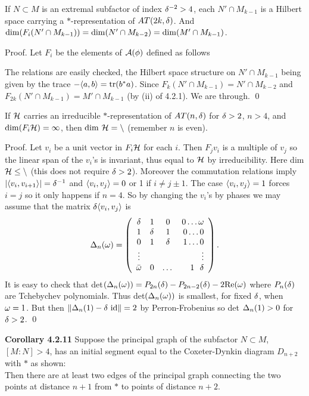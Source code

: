 \bigskip
{} If $N\subset M$ is an extremal subfactor
of index $\delta^{-2} >4$, each $N'\cap M_{k-1}$ is a Hilbert space
carrying a $*$-representation of $AT(2k,\delta)$. And
${\bf\rm{dim}}(F_i(N'\cap M_{k-1}))={\bf\rm{dim}}(N'\cap M_{k-2})=
{\bf\rm{dim}}(M'\cap M_{k-1})$.

\bigskip
{\sc Proof.} Let $F_i$ be the elements of $\cal A(\phi)$ defined
as follows

\newpage

\ni The relations are easily checked, the Hilbert space structure
on $N'\cap M_{k-1}$ being given by the trace
$-\langle a,b\rangle={\bf\rm{tr}}(b^*a)$. Since
$F_k(N'\cap M_{k-1})=N'\cap M_{k-2}$ and $F_{2k}
(N'\cap M_{k-1})=M'\cap M_{k-1}$ (by (ii) of 4.2.1).
We are through. \qed

\bigskip
{} If $\cal H$ carries an irreducible
 $*$-representation of $AT(n,\delta)$ for $\delta >2$, $n>4$, and
${\bf\rm{dim}}(F_i\cal H)=1$, then ${\bf\rm{dim}} \ \cal H=n$
(remember $n$ is even).

\bigskip
{\sc Proof.} Let $v_i$ be a unit vector in $F_i\cal H$ for each
$i$. Then $F_jv_i$ is a multiple of $v_j$ so the linear span of the
$v_i$'s is invariant, thus equal to $\cal H$ by irreducibility.
Here dim $\cal H\leq n$ (this does not require $\delta >2$). Moreover
the commutation relations imply $|\langle v_i,v_{i+1}\rangle|=\delta^{-1}$ and
$\langle v_i,v_j\rangle=0$ or 1 if $i\neq j\pm 1$. The case
$\langle v_i,v_j\rangle=1$ forces $i=j$ so it only happens if $n=4$.
So by changing the $v_i$'s by phases we may assume that the matrix
$\delta\langle v_i,v_j\rangle$ is
\[
\Delta_n(\omega) =\left(
\begin{array}{clcr}
\delta & 1 & 0 & 0  \dots  \omega \\
 1 & \delta & 1 & 0  \dots  0 \\
 0 & 1 & \delta & 1  \dots  0 \\
\vdots & {} & {} & {}    \vdots \\
\bar{\omega} & 0 & \dots & {}   {1 \ \ \delta}
\end{array}\right).
\]
It is easy to check that det$(\Delta_n(\omega))=P_{2n}(\delta)-P_{2n-2}(\delta)-2
{\bf\rm{Re}}(\omega)$ where $P_n(\delta)$ are Tchebychev polynomials.
Thus det$(\Delta_n(\omega))$ is smallest, for fixed $\delta$, when $\omega=1$.
But then \newline $\|\Delta_n(1)-\delta \ {\bf\rm{id}}\|=2$ by Perron-Frobenius
so det $\Delta_n(1) >0$ for $\delta >2$. \qed

\bs\ni
{\bf Corollary 4.2.11} Suppose the principal graph of the
subfactor $N\subset M$, $[M:N]>4$, has an initial segment equal to
the Coxeter-Dynkin diagram $D_{n+2}$ with $*$ as shown:
\[
        
\]
\ni Then there are at least two edges of the principal graph
connecting the two points at distance $n+1$ from $*$ to points of
distance $n+2$.

